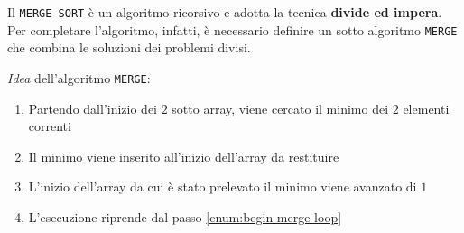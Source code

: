 \documentclass[italian, 10pt]{article}
\begin{document}
Il \texttt{MERGE-SORT} è un algoritmo ricorsivo e adotta la tecnica \textbf{divide ed impera}.
Per completare l'algoritmo, infatti, è necessario definire un sotto algoritmo \texttt{MERGE} che combina le soluzioni dei problemi divisi.

\textit{Idea} dell'algoritmo \texttt{MERGE}:

\begin{enumerate}
  \item \label{enum:begin-merge-loop} Partendo dall'inizio dei \(2\) sotto array, viene cercato il minimo dei \(2\) elementi correnti
  \item Il minimo viene inserito all'inizio dell'array da restituire
  \item L'inizio dell'array da cui è stato prelevato il minimo viene avanzato di \(1\)
  \item L'esecuzione riprende dal passo \ref{enum:begin-merge-loop}
\end{enumerate}
\end{document}
